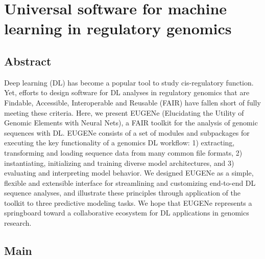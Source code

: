\chapter{Universal software for machine learning in regulatory genomics}
\label{chap:chapter 1}

\section{Abstract}

Deep learning (DL) has become a popular tool to study cis-regulatory function. Yet, efforts to design software for DL analyses in regulatory genomics that are Findable, Accessible, Interoperable and Reusable (FAIR) have fallen short of fully meeting these criteria. Here, we present EUGENe (Elucidating the Utility of Genomic Elements with Neural Nets), a FAIR toolkit for the analysis of genomic sequences with DL. EUGENe consists of a set of modules and subpackages for executing the key functionality of a genomics DL workflow: 1) extracting, transforming and loading sequence data from many common file formats, 2) instantiating, initializing and training diverse model architectures, and 3) evaluating and interpreting model behavior. We designed EUGENe as a simple, flexible and extensible interface for streamlining and customizing end-to-end DL sequence analyses, and illustrate these principles through application of the toolkit to three predictive modeling tasks. We hope that EUGENe represents a springboard toward a collaborative ecosystem for DL applications in genomics research.

\section{Main}

